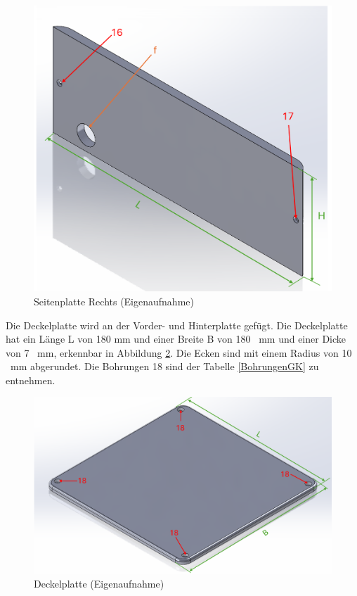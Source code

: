 \begin{figure}[H]
	\begin{center}
		\includegraphics[width=\textwidth]{Images/Konstruktion/SeiteRK.png}
		\caption{Seitenplatte Rechts (Eigenaufnahme)} \label{SeiteRK}
	\end{center}
\end{figure}

Die Deckelplatte wird an der Vorder- und Hinterplatte gefügt. Die Deckelplatte hat ein Länge L von 180 mm und einer Breite B von 180 \ mm und einer Dicke von 7 \ mm, erkennbar in Abbildung \ref{DeckelK}. Die Ecken sind mit einem Radius von 10 \ mm abgerundet. Die Bohrungen 18 sind der Tabelle \ref{BohrungenGK} zu entnehmen.

\begin{figure}[H]
	\begin{center}
		\includegraphics[width=\textwidth]{Images/Konstruktion/DeckelK.png}
		\caption{Deckelplatte (Eigenaufnahme)} \label{DeckelK}
	\end{center}
\end{figure}


